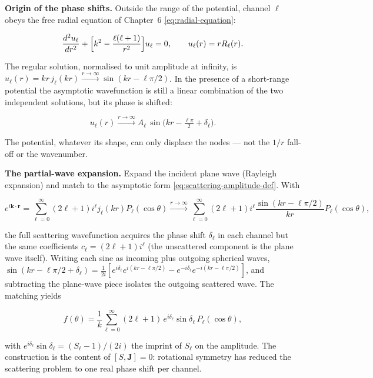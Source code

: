 \medskip\noindent\textbf{Origin of the phase shifts.}
Outside the range of the potential, channel $\ell$ obeys the free radial equation of Chapter~6 \eqref{eq:radial-equation}:
\begin{linenomath}
\begin{equation*}
\frac{d^{2}u_{\ell}}{dr^{2}} + \Bigl[k^{2} - \frac{\ell(\ell+1)}{r^{2}}\Bigr]u_{\ell} = 0,\qquad u_{\ell}(r)=rR_{\ell}(r).
\end{equation*}
\end{linenomath}
The regular solution, normalised to unit amplitude at infinity, is $u_{\ell}(r)=kr\,j_{\ell}(kr)\xrightarrow{r\to\infty}\sin(kr-\ell\pi/2)$. In the presence of a short-range potential the asymptotic wavefunction is still a linear combination of the two independent solutions, but its phase is shifted:
\begin{linenomath}
\begin{equation*}
u_{\ell}(r)\xrightarrow{r\to\infty}A_{\ell}\,\sin\!\bigl(kr-\tfrac{\ell\pi}{2}+\delta_{\ell}\bigr).
\end{equation*}
\end{linenomath}
The potential, whatever its shape, can only displace the nodes --- not the $1/r$ fall-off or the wavenumber.

\medskip\noindent\textbf{The partial-wave expansion.} Expand the incident plane wave (Rayleigh expansion) and match to the asymptotic form \eqref{eq:scattering-amplitude-def}. With
\begin{linenomath}
\begin{equation*}
e^{i\bm k\cdot\bm r}=\sum_{\ell=0}^{\infty}(2\ell+1)i^{\ell}j_{\ell}(kr)P_{\ell}(\cos\theta)\xrightarrow{r\to\infty}\sum_{\ell=0}^{\infty}(2\ell+1)i^{\ell}\frac{\sin(kr-\ell\pi/2)}{kr}P_{\ell}(\cos\theta),
\end{equation*}
\end{linenomath}
the full scattering wavefunction acquires the phase shift $\delta_{\ell}$ in each channel but the same coefficients $c_{\ell}=(2\ell+1)i^{\ell}$ (the unscattered component is the plane wave itself). Writing each sine as incoming plus outgoing spherical waves, $\sin(kr-\ell\pi/2+\delta_{\ell})=\frac{1}{2i}[e^{i\delta_{\ell}}e^{i(kr-\ell\pi/2)}-e^{-i\delta_{\ell}}e^{-i(kr-\ell\pi/2)}]$, and subtracting the plane-wave piece isolates the outgoing scattered wave. The matching yields
\begin{linenomath}
\begin{equation}
f(\theta)=\frac{1}{k}\sum_{\ell=0}^{\infty}(2\ell+1)\,e^{i\delta_{\ell}}\sin\delta_{\ell}\,P_{\ell}(\cos\theta),
\label{eq:partial-wave-expansion}
\end{equation}
\end{linenomath}
with $e^{i\delta_{\ell}}\sin\delta_{\ell}=(S_{\ell}-1)/(2i)$ the imprint of $S_{\ell}$ on the amplitude. The construction is the content of $[S,\bm J]=0$: rotational symmetry has reduced the scattering problem to one real phase shift per channel.

